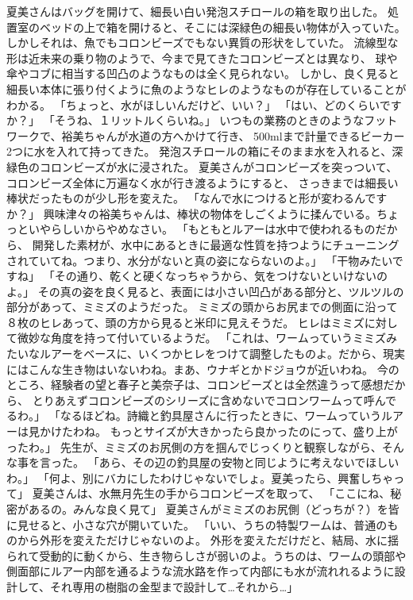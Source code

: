夏美さんはバッグを開けて、細長い白い発泡スチロールの箱を取り出した。
処置室のベッドの上で箱を開けると、そこには深緑色の細長い物体が入っていた。
しかしそれは、魚でもコロンビーズでもない異質の形状をしていた。
流線型な形は近未来の乗り物のようで、今まで見てきたコロンビーズとは異なり、
球や傘やコブに相当する凹凸のようなものは全く見られない。
しかし、良く見ると細長い本体に張り付くように魚のようなヒレのようなものが存在していることがわかる。
「ちょっと、水がほしいんだけど、いい？」
「はい、どのくらいですか？」
「そうね、１リットルくらいね。」
いつもの業務のときのようなフットワークで、裕美ちゃんが水道の方へかけて行き、
500mlまで計量できるビーカー2つに水を入れて持ってきた。
発泡スチロールの箱にそのまま水を入れると、深緑色のコロンビーズが水に浸された。
夏美さんがコロンビーズを突っついて、コロンビーズ全体に万遍なく水が行き渡るようにすると、
さっきまでは細長い棒状だったものが少し形を変えた。
「なんで水につけると形が変わるんですか？」
興味津々の裕美ちゃんは、棒状の物体をしごくように揉んでいる。ちょっといやらしいからやめなさい。
「もともとルアーは水中で使われるものだから、
開発した素材が、水中にあるときに最適な性質を持つようにチューニングされていてね。つまり、水分がないと真の姿にならないのよ。」
「干物みたいですね」
「その通り、乾くと硬くなっちゃうから、気をつけないといけないのよ。」
その真の姿を良く見ると、表面には小さい凹凸がある部分と、ツルツルの部分があって、ミミズのようだった。
ミミズの頭からお尻までの側面に沿って８枚のヒレあって、頭の方から見ると米印に見えそうだ。
ヒレはミミズに対して微妙な角度を持って付いているようだ。
「これは、ワームっていうミミズみたいなルアーをベースに、いくつかヒレをつけて調整したものよ。だから、現実にはこんな生き物はいないわね。まあ、ウナギとかドジョウが近いわね。
今のところ、経験者の望と春子と美奈子は、コロンビーズとは全然違うって感想だから、
とりあえずコロンビーズのシリーズに含めないでコロンワームって呼んでるわ。」
「なるほどね。詩織と釣具屋さんに行ったときに、ワームっていうルアーは見かけたわね。
もっとサイズが大きかったら良かったのにって、盛り上がったわ。」
先生が、ミミズのお尻側の方を掴んでじっくりと観察しながら、そんな事を言った。
「あら、その辺の釣具屋の安物と同じように考えないでほしいわ。」
「何よ、別にバカにしたわけじゃないでしょ。夏美ったら、興奮しちゃって」
夏美さんは、水無月先生の手からコロンビーズを取って、
「ここにね、秘密があるの。みんな良く見て」
夏美さんがミミズのお尻側（どっちが？）を皆に見せると、小さな穴が開いていた。
「いい、うちの特製ワームは、普通のものから外形を変えただけじゃないのよ。
外形を変えただけだと、結局、水に揺られて受動的に動くから、生き物らしさが弱いのよ。うちのは、ワームの頭部や側面部にルアー内部を通るような流水路を作って内部にも水が流れれるように設計して、それ専用の樹脂の金型まで設計して…それから…」
